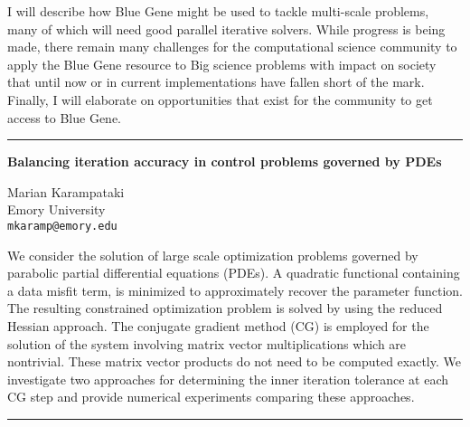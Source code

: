 \documentclass[twosided]{report}
\begin{document}
I will describe how
Blue Gene might be used to tackle multi-scale problems, many
of which will need good parallel iterative solvers. While
progress is being made, there remain many challenges for the
computational science community to apply the Blue Gene
resource to Big science problems with impact on society that
until now or in current implementations have fallen short of
the mark. Finally, I will elaborate on opportunities that
exist for the community to get access to Blue Gene.



	\begin{center} \rule{6in}{1pt} \end{center}

\begin{center}
{\large			%
{\bf Balancing iteration accuracy in control problems governed by PDEs}}

	Marian Karampataki \\
	Emory University \\
	{\tt mkaramp@emory.edu}
\end{center}
We consider the solution of large scale optimization
problems governed by parabolic partial differential
equations (PDEs). A quadratic functional containing a data
misfit term, is minimized to approximately recover the
parameter function.  The resulting constrained optimization
problem is solved by using the reduced Hessian approach. The
conjugate gradient method (CG) is employed for the solution
of the system involving matrix vector multiplications which
are nontrivial. These matrix vector products do not need to
be computed exactly. We investigate two approaches for
determining the inner iteration tolerance at each CG step
and provide numerical experiments comparing these
approaches.


	\begin{center} \rule{6in}{1pt} \end{center}
\end{document}
